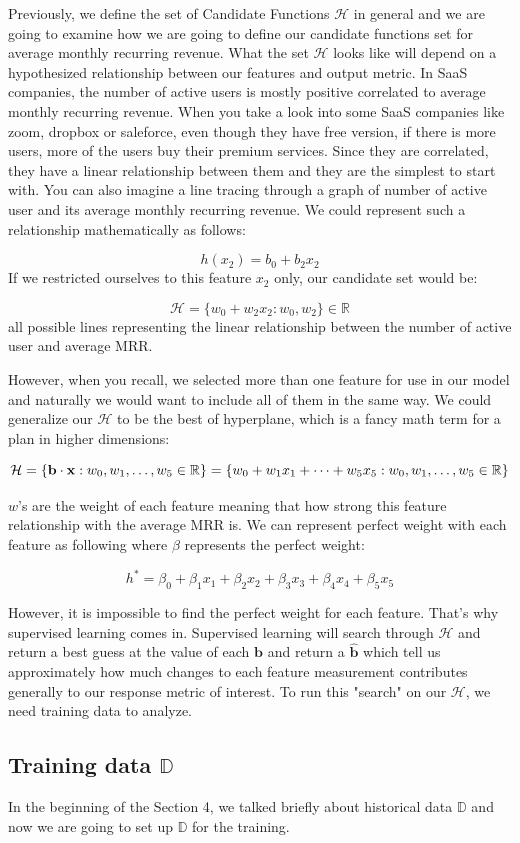 \documentclass[12pt]{article}
\begin{document}
Previously, we define the set of Candidate Functions $\mathcal{H}$ in general and we are going to examine how we are going to define our candidate functions set for average monthly recurring revenue. What the set $\mathcal{H}$ looks like will depend on a hypothesized relationship between our features and output metric. In SaaS companies, the number of active users is mostly positive correlated to average monthly recurring revenue. When you take a look into some SaaS companies like zoom, dropbox or saleforce, even though they have free version, if there is more users, more of the users buy their premium services. Since they are correlated, they have a linear relationship between them and they are the simplest to start with. You can also imagine a line tracing through a graph of number of active user and its average monthly recurring revenue. We could represent such a relationship mathematically as follows:

\[
h(x_2) = b_0 + b_2x_2
\]
If we restricted ourselves to this feature $x_2$ only, our candidate set would be:

\[
\mathcal{H} = \{w_0 + w_2x_2: w_0,w_2\} \in \mathbb{R}
\]
all possible lines representing the linear relationship between the number of active user and average MRR. 

However, when you recall, we selected more than one feature for use in our model and naturally we would want to include all of them in the same way. We could generalize our $\mathcal{H}$ to be the best of hyperplane, which is a fancy math term for a plan in higher dimensions:

\[
\mathcal{H} = \{\mathbf{b} \cdot \mathbf{x}: w_0, w_1, \dots, w_5 \space \in \mathbb{R}\} = \{w_0 + w_1x_1 + \dots + w_5x_5:w_0, w_1, \dots, w_5 \space \in \mathbb{R} \}
\]

$w$'s are the weight of each feature meaning that how strong this feature relationship with the average MRR is. We can represent perfect weight with each feature as following where $\beta$ represents the perfect weight:

\[
h^*  = \beta_0 + \beta_1x_1+ \beta_2x_2 + \beta_3x_3 + \beta_4x_4 + \beta_5x_5
\]


However, it is impossible to find the perfect weight for each feature. That's why supervised learning comes in. Supervised learning will search through $\mathcal{H}$ and return a best guess at the value of each $\mathbf{b}$ and return a $\hat{\mathbf{b}}$ which tell us approximately how much changes to each feature measurement contributes generally to our response metric of interest. To run this "search" on our $\mathcal{H}$, we need training data to analyze.

\subsection{Training data $\mathbb{D}$}

In the beginning of the Section 4, we talked briefly about historical data $\mathbb{D}$ and now we are going to set up $\mathbb{D}$ for the training. 
\end{document}
